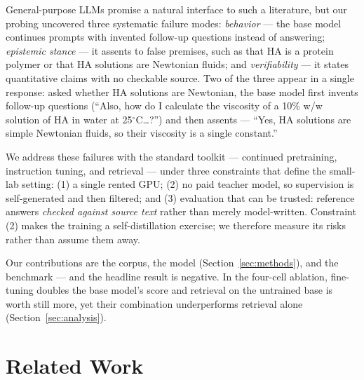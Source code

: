 \documentclass[11pt]{article}
\begin{document}
General-purpose LLMs promise a natural interface to such a literature,
but our probing uncovered three systematic failure modes:
\emph{behavior} --- the base model continues prompts with invented
follow-up questions instead of answering; \emph{epistemic stance} ---
it assents to false premises, such as that HA is a protein polymer or
that HA solutions are Newtonian fluids; and \emph{verifiability} --- it
states quantitative claims with no checkable source. Two of the three
appear in a single response: asked whether HA solutions are Newtonian,
the base model first invents follow-up questions (``Also, how do I
calculate the viscosity of a 10\% w/w solution of HA in water at
25$^\circ$C\ldots?'') and then assents --- ``Yes, HA solutions are
simple Newtonian fluids, so their viscosity is a single constant.''

We address these failures with the standard toolkit --- continued
pretraining, instruction tuning, and retrieval --- under three
constraints that define the small-lab setting: (1) a single rented GPU;
(2) no paid teacher model, so supervision is self-generated and then
filtered; and (3) evaluation that can be trusted: reference answers
\emph{checked against source text} rather than merely model-written.
Constraint (2) makes the training a self-distillation exercise; we
therefore measure its risks rather than assume them away.

Our contributions are the corpus, the model
(Section~\ref{sec:methods}), and the benchmark --- and the headline
result is negative. In the four-cell ablation, fine-tuning doubles the base
model's score and retrieval on the untrained base is worth still more,
yet their combination underperforms retrieval alone
(Section~\ref{sec:analysis}).

\section{Related Work}
\label{sec:related}
\end{document}
